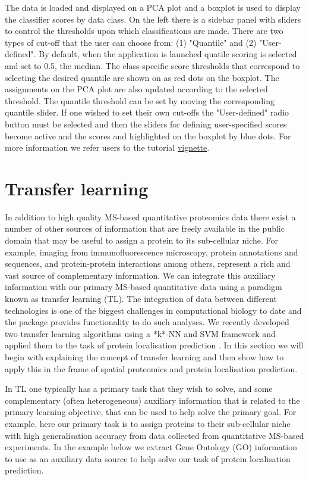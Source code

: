 The data is loaded and displayed on a PCA plot and a boxplot is used
to display the classifier scores by data class. On the left there is a
sidebar panel with sliders to control the thresholds upon which
classifications are made. There are two types of cut-off that the user
can choose from: (1) "Quantile" and (2) "User-defined". By default,
when the application is launched quatile scoring is selected and set
to 0.5, the median. The class-specific score thresholds that
correspond to selecting the desired quantile are shown on as red dots
on the boxplot. The assignments on the PCA plot are also updated
according to the selected threshold. The quantile threshold can be set
by moving the corresponding quantile slider. If one wished to set
their own cut-offs the "User-defined" radio button must be selected
and then the sliders for defining user-specified scores become active
and the scores and highlighted on the boxplot by blue dots. For more
information we refer users to the 
tutorial
\href{http://bioconductor.org/packages/release/bioc/vignettes/pRolocGUI/inst/doc/pRolocGUI.html}{vignette}.


\section*{Transfer learning}

In addition to high quality MS-based quantitative proteomics data
there exist a number of other sources of information that are freely
available in the public domain that may be useful to assign a protein
to its sub-cellular niche. For example, imaging from
immunofluorescence microscopy, protein annotations and sequences, and
protein-protein interactions among others, represent a rich and vast
source of complementary information. We can integrate this auxiliary
information with our primary MS-based quantitative data using a
paradigm known as transfer learning (TL). The integration of data
between different technologies is one of the biggest challenges in
computational biology to date and the  package
provides functionality to do such analyses. We recently developed two
transfer learning algorithms using a *k*-NN and SVM framework and
applied them to the task of protein localisation prediction
\cite{Breckels:2016}. In this section we will begin with explaining the
concept of transfer learning and then show how to apply this in the
frame of spatial proteomics and protein localisation prediction.

In TL one typically has a primary task that they wish to solve, and
some complementary (often heterogeneous) auxiliary information that is
related to the primary learning objective, that can be used to help
solve the primary goal. For example, here our primary task is to
assign proteins to their sub-cellular niche with high generalisation
accuracy from data collected from quantitative MS-based experiments.
In the example below we extract Gene Ontology (GO) information to use
as an auxiliary data source to help solve our task of protein
localisation prediction.

